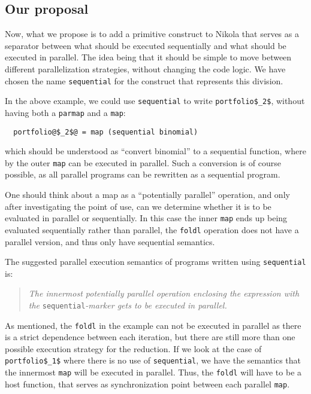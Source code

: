 \subsection{Our proposal}
Now, what we propose is to add a primitive construct to Nikola that
serves as a separator between what should be executed sequentially and
what should be executed in parallel. The idea being that it should be
simple to move between different parallelization strategies, without
changing the code logic. We have chosen the name \lstinline{sequential}
for the construct that represents this division.

In the above example, we could use \lstinline{sequential} to write
\lstinline[mathescape]{portfolio$_2$}, without having both a \lstinline{parmap}
and a \lstinline{map}:
\begin{lstlisting}
  portfolio@$_2$@ = map (sequential binomial)
\end{lstlisting}
which should be understood as ``convert binomial'' to a sequential
function, where by the outer \lstinline{map} can be executed in
parallel. Such a conversion is of course possible, as all parallel
programs can be rewritten as a sequential program.

One should think about a map as a ``potentially parallel'' operation,
and only after investigating the point of use, can we determine
whether it is to be evaluated in parallel or sequentially. In this
case the inner \lstinline{map} ends up being evaluated sequentially
rather than parallel, the \lstinline{foldl} operation does not have a
parallel version, and thus only have sequential semantics.

The suggested parallel execution semantics of programs written using
\lstinline{sequential} is:
\begin{quote}
  \emph{The innermost potentially parallel operation enclosing the
    expression with the }\lstinline{sequential}\emph{-marker gets to
    be executed in parallel.}
\end{quote}

As mentioned, the \lstinline{foldl} in the example can not be executed
in parallel as there is a strict dependence between each iteration,
but there are still more than one possible execution strategy for the
reduction. If we look at the case of
\lstinline[mathescape]{portfolio$_1$} where there is no use of
\lstinline{sequential}, we have the semantics that the innermost
\lstinline{map} will be executed in parallel. Thus, the
\lstinline{foldl} will have to be a host function, that serves as
synchronization point between each parallel \lstinline{map}.


